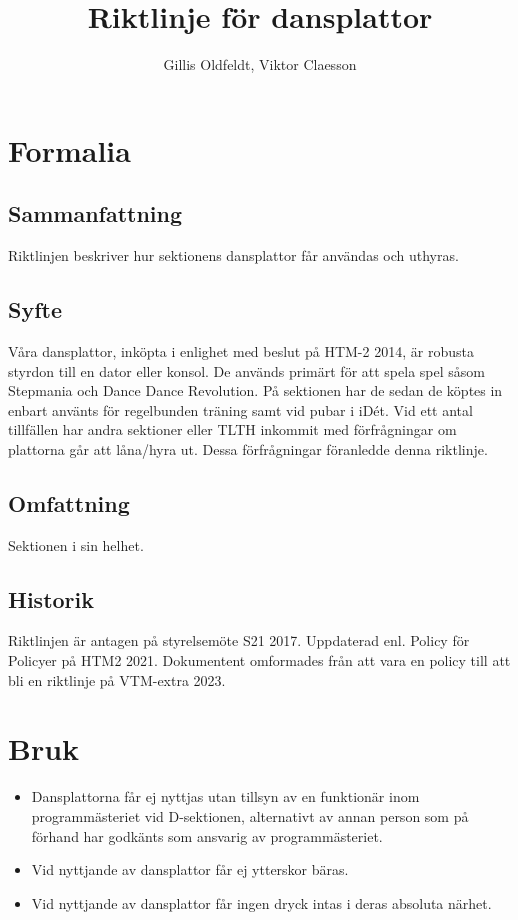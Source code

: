 \documentclass{dsekprotokoll}
\title{Riktlinje för dansplattor}
\author{Gillis Oldfeldt, Viktor Claesson}
\begin{document}
\maketitle
\section{Formalia}
\subsection{Sammanfattning}
Riktlinjen beskriver hur sektionens dansplattor får användas och uthyras.
\subsection{Syfte}
Våra dansplattor, inköpta i enlighet med beslut på HTM-2 2014, är
robusta styrdon till en dator
eller konsol. De används primärt för att spela spel såsom Stepmania
och Dance Dance Revolution. På sektionen har de sedan de köptes in
enbart använts för regelbunden träning samt vid
pubar i iDét. Vid ett antal tillfällen har andra sektioner eller TLTH
inkommit med förfrågningar
om plattorna går att låna/hyra ut. Dessa förfrågningar föranledde
denna riktlinje.

\subsection{Omfattning}
Sektionen i sin helhet.
\subsection{Historik}
Riktlinjen är antagen på styrelsemöte S21 2017.
Uppdaterad enl. Policy för Policyer på HTM2 2021. Dokumentent
omformades från att vara en policy till att bli en riktlinje på VTM-extra 2023.

\section{Bruk}
\begin{itemize}
  \item Dansplattorna får ej nyttjas utan tillsyn av en funktionär
    inom programmästeriet vid D-sektionen, alternativt av annan
    person som på förhand har godkänts som ansvarig av programmästeriet.
  \item Vid nyttjande av dansplattor får ej ytterskor bäras.
  \item Vid nyttjande av dansplattor får ingen dryck intas i deras
    absoluta närhet.
\end{itemize}
\end{document}
